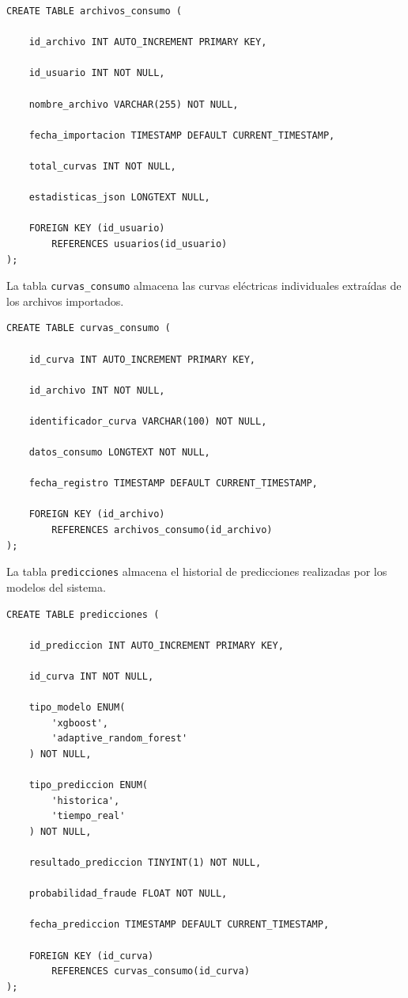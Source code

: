 \documentclass[12pt,a4paper]{report}
\begin{document}
\begin{lstlisting}[caption={Tabla de archivos.}, label={lst:tabla_archivos}]
CREATE TABLE archivos_consumo (

    id_archivo INT AUTO_INCREMENT PRIMARY KEY,

    id_usuario INT NOT NULL,

    nombre_archivo VARCHAR(255) NOT NULL,

    fecha_importacion TIMESTAMP DEFAULT CURRENT_TIMESTAMP,

    total_curvas INT NOT NULL,

    estadisticas_json LONGTEXT NULL,

    FOREIGN KEY (id_usuario)
        REFERENCES usuarios(id_usuario)
);
\end{lstlisting}

\medskip
\noindent La tabla \texttt{curvas\_consumo} almacena las curvas eléctricas individuales extraídas de los archivos importados.

\begin{lstlisting}[caption={Tabla de curvas.}, label={lst:tabla_curvas}]
CREATE TABLE curvas_consumo (

    id_curva INT AUTO_INCREMENT PRIMARY KEY,

    id_archivo INT NOT NULL,

    identificador_curva VARCHAR(100) NOT NULL,

    datos_consumo LONGTEXT NOT NULL,

    fecha_registro TIMESTAMP DEFAULT CURRENT_TIMESTAMP,

    FOREIGN KEY (id_archivo)
        REFERENCES archivos_consumo(id_archivo)
);
\end{lstlisting}

\medskip
\noindent La tabla \texttt{predicciones} almacena el historial de predicciones realizadas por los modelos del sistema.

\begin{lstlisting}[caption={Tabla de predicciones.}, label={lst:tabla_predicciones}]
CREATE TABLE predicciones (

    id_prediccion INT AUTO_INCREMENT PRIMARY KEY,

    id_curva INT NOT NULL,

    tipo_modelo ENUM(
        'xgboost',
        'adaptive_random_forest'
    ) NOT NULL,

    tipo_prediccion ENUM(
        'historica',
        'tiempo_real'
    ) NOT NULL,

    resultado_prediccion TINYINT(1) NOT NULL,

    probabilidad_fraude FLOAT NOT NULL,

    fecha_prediccion TIMESTAMP DEFAULT CURRENT_TIMESTAMP,

    FOREIGN KEY (id_curva)
        REFERENCES curvas_consumo(id_curva)
);
\end{lstlisting}
\end{document}
